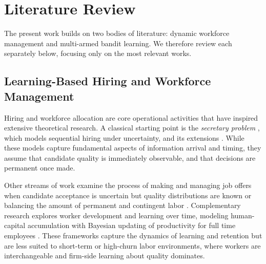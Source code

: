\documentclass[opre,blindrev]{informs3}
\begin{document}
\section{Literature Review}
The present work builds on two bodies of literature: dynamic workforce management and multi-armed bandit learning. We therefore review each separately below, focusing only on the most relevant works.

\vspace{-.1in}

\subsection{Learning-Based Hiring and Workforce Management}

Hiring and workforce allocation are core operational activities that have inspired extensive theoretical research. A classical starting point is the \emph{secretary problem} \citep{dynkin1963optimal, ferguson1989who}, which models sequential hiring under uncertainty, and its extensions \citep{kleinberg2005multiple, disser2020hiring, kesselheim2024hiring}. While these models capture fundamental aspects of information arrival and timing, they assume that candidate quality is immediately observable, and that decisions are permanent once made.

Other streams of work examine the process of making and managing job offers when candidate acceptance is uncertain but quality distributions are known \citep{purohit2019hiring, epstein2024selection, gans2002managing, du2024sequential} or balancing the amount of permanent and contingent labor \citep{king2016dynamic, dong2020managing, berenguer2024managing, lobel2024frontiers}.
Complementary research explores worker development and learning over time, modeling human-capital accumulation with Bayesian updating of productivity for full time employees \citep{arlotto2014optimal}. These frameworks capture the dynamics of learning and retention but are less suited to short-term or high-churn labor environments, where workers are interchangeable and firm-side learning about quality dominates.
\end{document}
